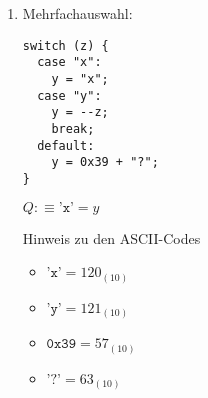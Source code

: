 \documentclass{bschlangaul-aufgabe}
\begin{document}
\begin{enumerate}
\begin{liAntwort}
\end{liAntwort}

%

\item Mehrfachauswahl:

\begin{verbatim}
switch (z) {
  case "x":
    y = "x";
  case "y":
    y = --z;
    break;
  default:
    y = 0x39 + "?";
}
\end{verbatim}

$Q :\equiv \texttt{'x'} = y$

Hinweis zu den ASCII-Codes

\begin{itemize}
\item $\texttt{'x'} = 120_{(10)}$
\item $\texttt{'y'} = 121_{(10)}$
\item $\texttt{0x39} = 57_{(10)}$
\item $\texttt{'?'} = 63_{(10)}$
\end{itemize}

\end{enumerate}
\end{document}
